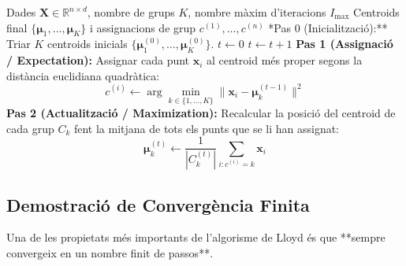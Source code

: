 \documentclass[11pt, a4paper]{article}
\begin{document}
\begin{algorithm}[H]
\caption{Algorisme de Lloyd per a $K$-means}
\begin{algorithmic}[1]
\Require Dades $\mathbf{X} \in \mathbb{R}^{n \times d}$, nombre de grups $K$, nombre màxim d'iteracions $I_{\max}$
\Ensure Centroids final $\{\boldsymbol{\mu}_1, \dots, \boldsymbol{\mu}_K\}$ i assignacions de grup $c^{(1)}, \dots, c^{(n)}$
\State **Pas 0 (Inicialització):** Triar $K$ centroids inicials $\{\boldsymbol{\mu}_1^{(0)}, \dots, \boldsymbol{\mu}_K^{(0)}\}$.
\State $t \leftarrow 0$
\Repeat
    \State $t \leftarrow t + 1$
    \State \textbf{Pas 1 (Assignació / Expectation):} Assignar cada punt $\mathbf{x}_i$ al centroid més proper segons la distància euclidiana quadràtica:
    \[
    c^{(i)} \leftarrow \arg\min_{k \in \{1, \dots, K\}} \lVert \mathbf{x}_i - \boldsymbol{\mu}_k^{(t-1)} \rVert^2
    \]
    \State \textbf{Pas 2 (Actualització / Maximization):} Recalcular la posició del centroid de cada grup $C_k$ fent la mitjana de tots els punts que se li han assignat:
    \[
    \boldsymbol{\mu}_k^{(t)} \leftarrow \frac{1}{|C_k^{(t)}|} \sum_{i: c^{(i)} = k} \mathbf{x}_i
    \]
\end{algorithmic}
\end{algorithm}

\subsection{Demostració de Convergència Finita}
Una de les propietats més importants de l'algorisme de Lloyd és que **sempre convergeix en un nombre finit de passos**.
\end{document}
